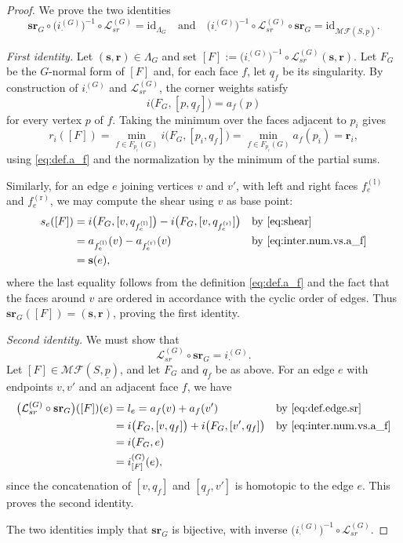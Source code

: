 \documentclass[11pt, letterpaper]{amsart}
\theoremstyle{definition}
\theoremstyle{remark}
\newcommand{\up}{\underline{p}}
\newcommand{\cMFp}{\mathcal{MF} (S,\up)}
\numberwithin{equation}{section}
\begin{document}
\begin{proof}
We prove the two identities
\[
\mathbf{sr}_G \circ \bigl(i^{(G)}_{\cdot}\bigr)^{-1} \circ \mathcal{L}^{(G)}_{sr} = \mathrm{id}_{\Lambda_G}
\quad\text{and}\quad
\bigl(i^{(G)}_{\cdot}\bigr)^{-1} \circ \mathcal{L}^{(G)}_{sr} \circ \mathbf{sr}_G = \mathrm{id}_{\cMFp}.
\]

\emph{First identity.}
Let \((\mathbf{s},\mathbf{r})\in\Lambda_G\) and set \([F]:=\bigl(i^{(G)}_{\cdot}\bigr)^{-1}\circ\mathcal{L}^{(G)}_{sr}(\mathbf{s},\mathbf{r})\).
Let \(F_G\) be the \(G\)-normal form of \([F]\) and, for each face \(f\), let \(q_f\) be its singularity.
By construction of \(i^{(G)}_{\cdot}\) and \(\mathcal{L}^{(G)}_{sr}\), the corner weights satisfy
\begin{equation}
    \label{eq:inter.num.vs.a_f}
    i\bigl(F_G,[p,q_f]\bigr) = a_f(p)
\end{equation}
for every vertex \(p\) of \(f\).
Taking the minimum over the faces adjacent to \(p_i\) gives
\[
r_i([F])
= \min_{f\in F_{p_i}(G)} i\bigl(F_G,[p_i,q_f]\bigr)
= \min_{f\in F_{p_i}(G)} a_f(p_i)
= \mathbf{r}_i,
\]
using \eqref{eq:def.a_f} and the normalization by the minimum of the partial sums.

Similarly, for an edge \(e\) joining vertices \(v\) and \(v'\), with left and right faces \(f^{(\mathrm{l})}_e\) and \(f^{(\mathrm{r})}_e\), we may compute the shear using \(v\) as base point:
\begin{align*}
    s_e([F])
    &= i\bigl(F_G,[v,q_{f^{(\mathrm{l})}_e}]\bigr) - i\bigl(F_G,[v,q_{f^{(\mathrm{r})}_e}]\bigr)
      &&\text{by \eqref{eq:shear}} \\
    &= a_{f^{(\mathrm{l})}_e}(v) - a_{f^{(\mathrm{r})}_e}(v)
      &&\text{by \eqref{eq:inter.num.vs.a_f}} \\
    &= \mathbf{s}(e),
\end{align*}
where the last equality follows from the definition \eqref{eq:def.a_f} and the fact that the faces around \(v\) are ordered in accordance with the cyclic order of edges.
Thus \(\mathbf{sr}_G([F]) = (\mathbf{s},\mathbf{r})\), proving the first identity.

\emph{Second identity.}
We must show that
\[
\mathcal{L}^{(G)}_{sr} \circ \mathbf{sr}_G = i^{(G)}_{\cdot}.
\]
Let \([F]\in\cMFp\), and let \(F_G\) and \(q_f\) be as above.
For an edge \(e\) with endpoints \(v,v'\) and an adjacent face \(f\), we have
\begin{align*}
\bigl(\mathcal{L}^{(G)}_{sr}\circ\mathbf{sr}_G\bigr)([F])(e)
&= l_e = a_f(v) + a_f(v') &&\text{by \eqref{eq:def.edge.sr}} \\
&= i\bigl(F_G,[v,q_f]\bigr) + i\bigl(F_G,[v',q_f]\bigr)
   &&\text{by \eqref{eq:inter.num.vs.a_f}} \\
&= i(F_G,e) \\
&= i^{(G)}_{[F]}(e),
\end{align*}
since the concatenation of \([v,q_f]\) and \([q_f,v']\) is homotopic to the edge \(e\).
This proves the second identity.

The two identities imply that \(\mathbf{sr}_G\) is bijective, with inverse \(\bigl(i^{(G)}_{\cdot}\bigr)^{-1}\circ\mathcal{L}^{(G)}_{sr}\).
\end{proof}
\end{document}
